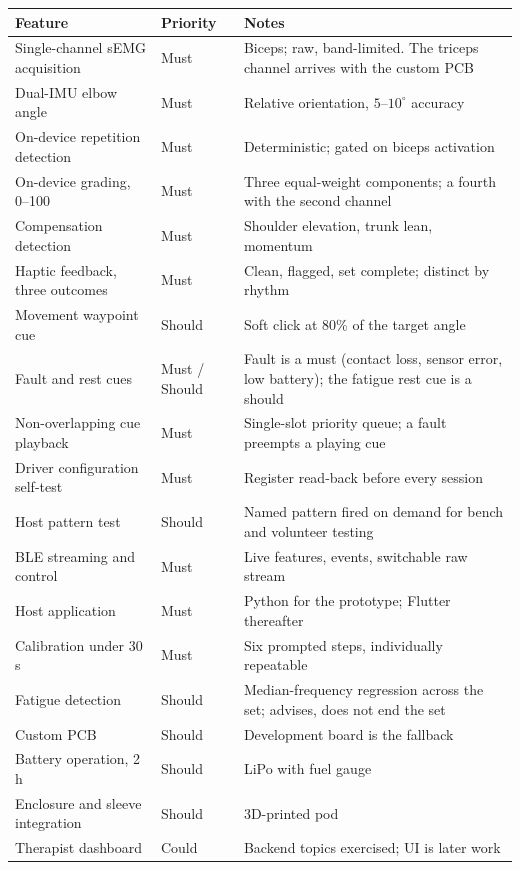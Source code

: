 \documentclass[11pt]{article}
\begin{document}
\begin{table}[H]
\centering\small
\begin{tabularx}{\linewidth}{@{}p{46mm} p{20mm} X@{}}
\toprule
\textbf{Feature} & \textbf{Priority} & \textbf{Notes} \\
\midrule
Single-channel sEMG acquisition & Must & Biceps; raw, band-limited. The triceps channel arrives with the custom PCB \\
Dual-IMU elbow angle & Must & Relative orientation, $5$--$10^{\circ}$ accuracy \\
On-device repetition detection & Must & Deterministic; gated on biceps activation \\
On-device grading, 0--100 & Must & Three equal-weight components; a fourth with the second channel \\
Compensation detection & Must & Shoulder elevation, trunk lean, momentum \\
Haptic feedback, three outcomes & Must & Clean, flagged, set complete; distinct by rhythm \\
Movement waypoint cue & Should & Soft click at 80\% of the target angle \\
Fault and rest cues & Must / Should & Fault is a must (contact loss, sensor error, low battery); the fatigue rest cue is a should \\
Non-overlapping cue playback & Must & Single-slot priority queue; a fault preempts a playing cue \\
Driver configuration self-test & Must & Register read-back before every session \\
Host pattern test & Should & Named pattern fired on demand for bench and volunteer testing \\
BLE streaming and control & Must & Live features, events, switchable raw stream \\
Host application & Must & Python for the prototype; Flutter thereafter \\
Calibration under 30\,s & Must & Six prompted steps, individually repeatable \\
Fatigue detection & Should & Median-frequency regression across the set; advises, does not end the set \\
Custom PCB & Should & Development board is the fallback \\
Battery operation, 2\,h & Should & LiPo with fuel gauge \\
Enclosure and sleeve integration & Should & 3D-printed pod \\
Therapist dashboard & Could & Backend topics exercised; UI is later work \\
\bottomrule
\end{tabularx}
\end{table}
\end{document}
